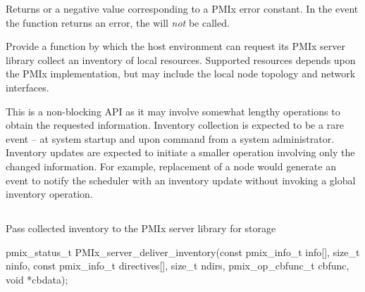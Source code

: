 \begin{arglist}
\end{arglist}

Returns  or a negative value corresponding to a PMIx error constant. In the event the function returns an error, the  will \textit{not} be called.

\descr

Provide a function by which the host environment can request its \ac{PMIx} server library collect an inventory of local resources. Supported resources depends upon the \ac{PMIx} implementation, but may include the local node topology and network interfaces.

\advicermstart
This is a non-blocking \ac{API} as it may involve somewhat lengthy operations to obtain the requested information. Inventory collection is expected to be a rare event – at system startup and upon command from a system administrator. Inventory updates are expected to initiate a smaller operation involving only the changed information. For example, replacement of a node would generate an event to notify the scheduler with an inventory update without invoking a global inventory operation.
\advicermend

\subsection{}

\summary

Pass collected inventory to the \ac{PMIx} server library for storage

\format

\cspecificstart
\begin{codepar}
pmix_status_t
PMIx_server_deliver_inventory(const pmix_info_t info[],
                              size_t ninfo,
                              const pmix_info_t directives[],
                              size_t ndirs,
                              pmix_op_cbfunc_t cbfunc,
                              void *cbdata);
\end{codepar}
\cspecificend

